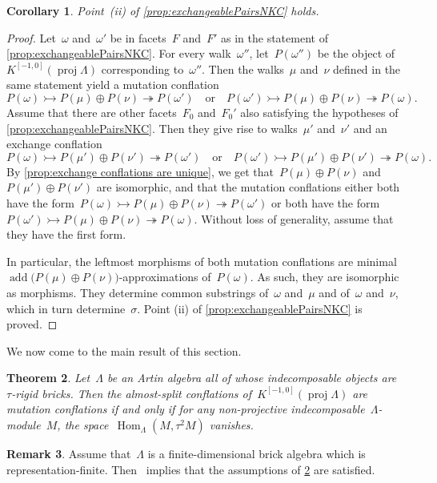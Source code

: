 \documentclass{amsart}
\newtheorem{theorem}{Theorem}[section]
\newtheorem{corollary}[theorem]{Corollary}
\theoremstyle{definition}
\newtheorem{remark}[theorem]{Remark}
\newcommand{\Hom}[1]{\operatorname{Hom}_{#1}}
\newcommand{\add}{\operatorname{add}}
\newcommand{\proj}{\operatorname{proj}}
\newcommand{\infl}{\rightarrowtail}
\newcommand{\defl}{\twoheadrightarrow}
\begin{document}
\begin{corollary}
\label{coro:exchangeablePairsNKC}
Point~(ii) of \cref{prop:exchangeablePairsNKC} holds.
\end{corollary}

\begin{proof}
Let~$\omega$ and~$\omega'$ be in facets~$F$ and~$F'$ as in the statement of \cref{prop:exchangeablePairsNKC}. For every walk~$\omega''$, let~$P(\omega'')$ be the object of~$K^{[-1,0]}(\proj \Lambda)$ corresponding to~$\omega''$. Then the walks~$\mu$ and~$\nu$ defined in the same statement yield a mutation conflation
\[
P(\omega) \infl P(\mu) \oplus P(\nu) \defl P(\omega') \quad \textrm{or} \quad P(\omega') \infl P(\mu) \oplus P(\nu) \defl P(\omega).
\]
Assume that there are other facets~$F_0$ and~$F_0'$ also satisfying the hypotheses of \cref{prop:exchangeablePairsNKC}. Then they give rise to walks~$\mu'$ and~$\nu'$ and an exchange conflation
\[
P(\omega) \infl P(\mu') \oplus P(\nu') \defl P(\omega') \quad \textrm{or} \quad P(\omega') \infl P(\mu') \oplus P(\nu') \defl P(\omega).
\]
By \cref{prop:exchange conflations are unique}, we get that~$P(\mu)\oplus P(\nu)$ and~$P(\mu')\oplus P(\nu')$ are isomorphic, and that the mutation conflations either both have the form~$P(\omega) \infl P(\mu) \oplus P(\nu) \defl P(\omega')$ or both have the form~$P(\omega') \infl P(\mu) \oplus P(\nu) \defl P(\omega)$. Without loss of generality, assume that they have the first form.
 
In particular, the leftmost morphisms of both mutation conflations are minimal ${\add \big( P(\mu) \oplus P(\nu) \big)}$-approximations of~$P(\omega)$. As such, they are isomorphic as morphisms. They determine common substrings of~$\omega$ and~$\mu$ and of~$\omega$ and~$\nu$, which in turn determine~$\sigma$. Point (ii) of \cref{prop:exchangeablePairsNKC} is proved.
\end{proof}

We now come to the main result of this section.

\begin{theorem}
\label{thm:brick-algebra-condition}
Let~$\Lambda$ be an Artin algebra all of whose indecomposable objects are ~$\tau$-rigid bricks. Then the almost-split conflations of~$K^{[-1,0]}(\proj \Lambda)$ are mutation conflations if and only if for any non-projective indecomposable~$\Lambda$-module~$M$, the space~$\Hom{\Lambda}(M, \tau^2 M)$ vanishes.
\end{theorem}

\begin{remark}
Assume that~$\Lambda$ is a finite-dimensional brick algebra which is representation-finite.
Then~\cite[Thm.~6.2]{DemonetIyamaJasso} implies that the assumptions of \cref{thm:brick-algebra-condition} are satisfied.
\end{remark}
\end{document}
